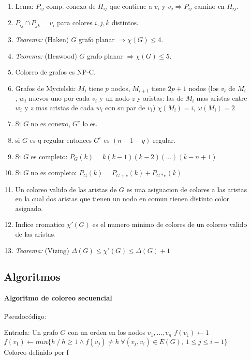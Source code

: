 \begin{enumerate}
\item Lema: $P_{ij}$ comp. conexa de $H_{ij}$ que contiene a $v_{i}$ y $v_{j} \Rightarrow P_{ij}$ camino en $H_{ij}$.
\item $P_{ij} \cap P_{jk} = {v_{i}}$ para colores $i,j,k$ distintos.
\item \textit{Teorema:} (Haken) $G$ grafo planar $\Rightarrow \chi(G) \leq 4$.
\item \textit{Teorema:} (Heawood) $G$ grafo planar $\Rightarrow \chi(G) \leq 5$.
\item Coloreo de grafos es NP-C.
\item Grafos de Mycielski: $M_{i}$ tiene $p$ nodos, $M_{i+1}$ tiene $2p+1$ nodos (los $v_{i}$ de $M_{i}$, $w_{i}$ nuevos uno por cada $v_{i}$ y un nodo $z$ y aristas: las de $M_{i}$ mas aristas entre $w_{i}$ y $z$ mas aristas de cada $w_{i}$ con su par de $v_{i}$) $\chi(M_{i})=i$, $\omega(M_{i})=2$
\item Si $G$ no es conexo, $G^{c}$ lo es.
\item si $G$ es q-regular entonces $G^{c}$ es $(n-1-q)$-regular.
\item Si $G$ es completo: $P_{G}(k)= k(k-1)(k-2)(...)(k-n+1)$
\item Si $G$ no es completo: $P_{G}(k)= P_{G+e}(k) + P_{G*e}(k)$
\item Un coloreo valido de las aristas de $G$ es una asignacion de colores a las aristas en la cual dos aristas que tienen un nodo en comun tienen distinto color asignado.
\item Indice cromatico $\chi'(G)$ es el numero minimo de colores de un coloreo valido de las aristas.
\item \textit{Teorema:} (Vizing) $\Delta(G) \leq \chi'(G) \leq \Delta(G)+1$
\end{enumerate}

\subsection{Algoritmos}
\paragraph{Algoritmo de coloreo secuencial}

Pseudocódigo:
\begin{algorithmic}[1]
    \State Entrada: Un grafo $G$ con un orden en los nodos $v_1, \dots, v_n$
    \State $f(v_1) \gets 1$
        \State $f(v_1) \gets min\{h\ /\ h \geq 1 \land f(v_j) \neq h\ \forall(v_j,v_i) \in E(G),\ 1 \leq j \leq i-1 \}$
    \EndFor
    \State \Return Coloreo definido por f
\end{algorithmic}
